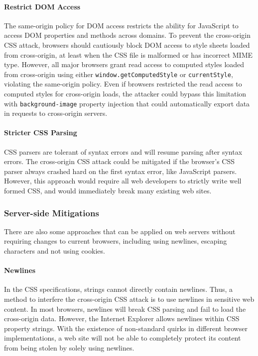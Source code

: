 \documentclass{acm_proc_article-sp}
\begin{document}
\paragraph{Restrict DOM Access}
The same-origin policy for DOM access restricts the ability for JavaScript to access DOM properties and methods across domains. To prevent the cross-origin CSS attack, browsers should cautiously block DOM access to style sheets loaded from cross-origin, at least when the CSS file is malformed or has incorrect MIME type. However, all major browsers grant read access to computed styles loaded from cross-origin using either \texttt{window.getComputedStyle} or \texttt{currentStyle}, violating the same-origin policy. Even if browsers restricted the read access to computed styles for cross-origin loads, the attacker could bypass this limitation with \texttt{background-image} property injection that could automatically export data in requests to cross-origin servers.

\paragraph{Stricter CSS Parsing}
CSS parsers are tolerant of syntax errors and will resume parsing after syntax errors. The cross-origin CSS attack could be mitigated if the browser's CSS parser always crashed hard on the first syntax error, like JavaScript parsers. However, this approach would require all web developers to strictly write well formed CSS, and would immediately break many existing web sites.

\subsubsection{Server-side Mitigations}
There are also some approaches that can be applied on web servers without requiring changes to current browsers, including using newlines, escaping characters and not using cookies.

\paragraph{Newlines}
In the CSS specifications, strings cannot directly contain newlines. Thus, a method to interfere the cross-origin CSS attack is to use newlines in sensitive web content. In most browsers, newlines will break CSS parsing and fail to load the cross-origin data. However, the Internet Explorer allows newlines within CSS property strings. With the existence of non-standard quirks in different browser implementations, a web site will not be able to completely protect its content from being stolen by solely using newlines.
\end{document}
